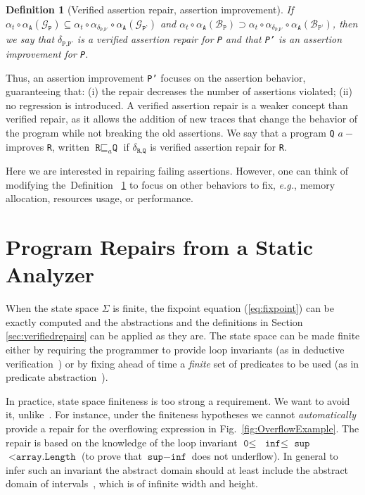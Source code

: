 \documentclass[10pt]{sigplanconf}
\newtheorem{definition}{Definition}
\newcommand{\labelDef}[1]{\label{def:#1}}
\newcommand{\refFig}[1]{Fig.~\ref{fig:#1}}
\newcommand{\refDef}[1]{Definition ~\ref{def:#1}}
\newcommand{\code}[1]{\texttt{#1}}
\newcommand{\diff}[2]{\delta_{\code{#1}, \code{#2}}}
\begin{document}
\begin{definition}[Verified assertion repair, assert\-ion im\-prove\-ment]
\labelDef{AssertionRepair}
If $\alpha_{t} \circ \alpha_\code{A}(\mathcal{G}_\code{P}) \subseteq \alpha_{t} \circ \alpha_{\diff{P}{P'}} \circ\alpha_\code{A}(\mathcal{G}_\code{P'})$ and 
$\alpha_{t} \circ \alpha_\code{A}(\mathcal{B}_\code{P}) \supset \alpha_{t} \circ \alpha_{\diff{P}{P'}}\circ \alpha_\code{A}(\mathcal{B}_\code{P'})$, then we say that  $\diff{P}{P'}$ is a verified \emph{assertion} repair for \code{P} and that \code{P'} is an \emph{assertion} improvement for \code{P}.
\end{definition}

Thus, an assertion improvement \code{P'} focuses on the assertion
behavior, guaranteeing that: (i) the repair decreases the number of
assertions violated; (ii) no regression is introduced.  A verified
assertion repair is a weaker concept than verified repair, as it
allows the addition of new traces that change the behavior of the
program while not breaking the old assertions.  We say that a program
\code{Q} $a-$improves \code{R}, written $\code{R} \sqsubseteq_a \code{Q}$
if $\diff{R}{Q}$ is verified assertion repair for \code{R}.

Here we are interested in repairing failing assertions.
However, one can think of modifying the~\refDef{AssertionRepair}  to focus on other behaviors to fix, \emph{e.g.}, memory allocation, resources usage, or performance.

\section{Program Repairs from a Static Analyzer}
\label{sec:fromStaticAnalyzer}

When the state space $\Sigma$ is finite, the fixpoint equation (\ref{eq:fixpoint}) can be exactly computed and the abstractions and the definitions in Section \ref{sec:verifiedrepairs} can be applied as they are.
The state space can be made finite either by requiring the programmer to provide loop invariants (as in deductive verification~\cite{Hoare69}) or by fixing ahead of time a \emph{finite} set of predicates to be used (as in predicate abstraction~\cite{ClarkeEtAl00}).

In practice, state space finiteness is too strong a requirement.
We want to avoid it, unlike~\cite{SamantaEtAl08,GriesmayerEtAl06}.
For instance, under the finiteness hypotheses we cannot  \emph{automatically} provide a repair for the overflowing expression in \refFig{OverflowExample}.
The repair is based on the knowledge of the loop invariant $\code{0} \leq$ $\code{inf} \leq $ $\code{sup}$ $< \code{array.Length}$ (to prove that $\code{sup} - \code{inf}$ does not underflow).
In general to infer such an invariant the abstract domain should at least include the abstract domain of intervals~\cite{CousotCousot77}, which is of infinite width and height.
\end{document}
